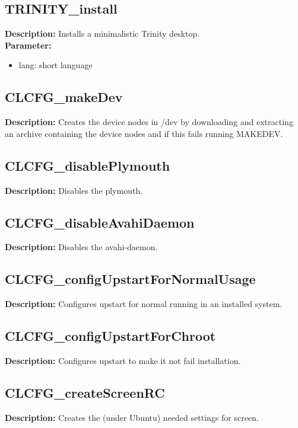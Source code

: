 \subsection{TRINITY\_install}
\textbf{Description:} Installs a minimalistic Trinity desktop.\\
\textbf{Parameter:}
\begin{itemize}
\item lang: short language
\end{itemize}

\subsection{CLCFG\_makeDev}
\textbf{Description:} Creates the device nodes in /dev by downloading and extracting an archive containing the device nodes and if this fails running MAKEDEV.\\

\subsection{CLCFG\_disablePlymouth}
\textbf{Description:} Disables the plymouth.\\

\subsection{CLCFG\_disableAvahiDaemon}
\textbf{Description:} Disables the avahi-daemon.\\

\subsection{CLCFG\_configUpstartForNormalUsage}
\textbf{Description:} Configures upstart for normal running in an installed system.\\

\subsection{CLCFG\_configUpstartForChroot}
\textbf{Description:} Configures upstart to make it not fail installation.\\

\subsection{CLCFG\_createScreenRC}
\textbf{Description:} Creates the (under Ubuntu) needed settings for screen.\\

